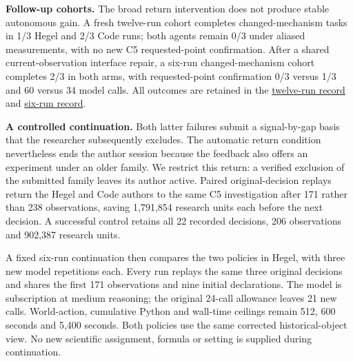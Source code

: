 \documentclass[11pt,a4paper]{article}
\begin{document}
\textbf{Follow-up cohorts.} The broad return intervention does not produce stable autonomous gain. A fresh twelve-run cohort completes changed-mechanism tasks in 1/3 Hegel and 2/3 Code runs; both agents remain 0/3 under aliased measurements, with no new C5 requested-point confirmation. After a shared current-observation interface repair, a six-run changed-mechanism cohort completes 2/3 in both arms, with requested-point confirmation 0/3 versus 1/3 and 60 versus 34 model calls. All outcomes are retained in the \hyperlink{artifact-117}{twelve-run record} and \hyperlink{artifact-118}{six-run record}.


\textbf{A controlled continuation.} Both latter failures submit a signal-by-gap basis that the researcher subsequently excludes. The automatic return condition nevertheless ends the author session because the feedback also offers an experiment under an older family. We restrict this return: a verified exclusion of the submitted family leaves its author active. Paired original-decision replays return the Hegel and Code authors to the same C5 investigation after 171 rather than 238 observations, saving 1,791,854 research units each before the next decision. A successful control retains all 22 recorded decisions, 206 observations and 902,387 research units.


A fixed six-run continuation then compares the two policies in Hegel, with three new model repetitions each. Every run replays the same three original decisions and shares the first 171 observations and nine initial declarations. The model is subscription  at medium reasoning; the original 24-call allowance leaves 21 new calls. World-action, cumulative Python and wall-time ceilings remain 512, 600 seconds and 5,400 seconds. Both policies use the same corrected historical-object view. No new scientific assignment, formula or setting is supplied during continuation.
\end{document}
